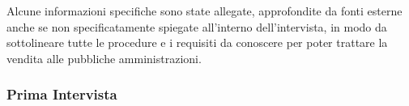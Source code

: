 
Alcune informazioni specifiche sono state allegate, approfondite da fonti esterne anche se non specificatamente spiegate all'interno dell'intervista, in modo da sottolineare tutte le procedure e i requisiti da conoscere per poter trattare la vendita alle pubbliche amministrazioni.

\subsubsection{Prima Intervista} %

\medskip


